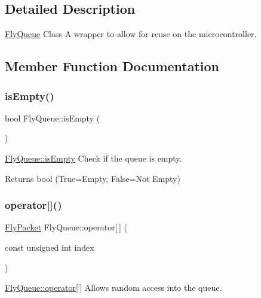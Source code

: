 \subsection{Detailed Description}
\hyperlink{class_fly_queue}{Fly\+Queue} Class A wrapper to allow for reuse on the microcontroller. 

\subsection{Member Function Documentation}
\hypertarget{class_fly_queue_ac866e43ea0e8e6aab10d4e2ca5f733f3}{}\label{class_fly_queue_ac866e43ea0e8e6aab10d4e2ca5f733f3} 
\subsubsection{\texorpdfstring{is\+Empty()}{isEmpty()}}
{\footnotesize\ttfamily bool Fly\+Queue\+::is\+Empty (\begin{DoxyParamCaption}{ }\end{DoxyParamCaption})}



\hyperlink{class_fly_queue_ac866e43ea0e8e6aab10d4e2ca5f733f3}{Fly\+Queue\+::is\+Empty} Check if the queue is empty. 

\begin{DoxyReturn}{Returns}
bool (True=Empty, False=Not Empty) 
\end{DoxyReturn}
\hypertarget{class_fly_queue_a00f38b409354127748f2093d38dee7be}{}\label{class_fly_queue_a00f38b409354127748f2093d38dee7be} 
\subsubsection{\texorpdfstring{operator[]()}{operator[]()}}
{\footnotesize\ttfamily \hyperlink{class_fly_packet}{Fly\+Packet} Fly\+Queue\+::operator\mbox{[}$\,$\mbox{]} (\begin{DoxyParamCaption}\item[{const unsigned int}]{index }\end{DoxyParamCaption})}



\hyperlink{class_fly_queue_a00f38b409354127748f2093d38dee7be}{Fly\+Queue\+::operator\mbox{[}$\,$\mbox{]}} Allows random access into the queue. 


